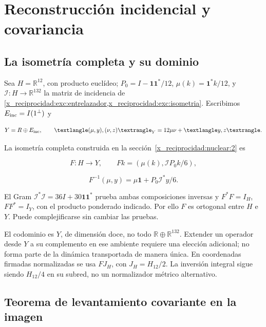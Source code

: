 \chapter{Reconstrucción incidencial y covariancia}
\label{x_reciprocidad:nuclear:5}
\section{La isometría completa y su dominio}\label{x_reciprocidad:nuc05:isometria}

Sea \(H=\mathbb R^{12}\), con producto euclídeo; \(P_0=I-\mathbf1\mathbf1^*/12\), \(\mu(k)=\mathbf1^*k/12\), y \(\mathcal I:H\to\mathbb R^{132}\) la matriz de incidencia de \cref{x_reciprocidad:exc:entrelazador,x_reciprocidad:exc:isometria}. Escribimos \(E_{\rm inc}=\mathcal I(\mathbf1^\perp)\) y

\[
Y=\mathbb R\oplus E_{\rm inc},\qquad
\langle(\mu,y),(\nu,z)\rangle_Y=12\mu\nu+\langle y,z\rangle.
\]

La isometría completa construida en la sección~\ref{x_reciprocidad:nuclear:2} es

\[
F:H\longrightarrow Y,\qquad Fk=(\mu(k),\mathcal I P_0k/6),
\]

\[
F^{-1}(\mu,y)=\mu\mathbf1+P_0\mathcal I^*y/6.
\]

El Gram \(\mathcal I^*\mathcal I=36I+30\mathbf1\mathbf1^*\) prueba ambas composiciones inversas y \(F^*F=I_H\), \(FF^*=I_Y\), con el producto ponderado indicado. Por ello \(F\) es ortogonal entre \(H\) e \(Y\). Puede complejificarse sin cambiar las pruebas.

El codominio es \(Y\), de dimensión doce, no todo \(\mathbb R\oplus\mathbb R^{132}\). Extender un operador desde \(Y\) a su complemento en ese ambiente requiere una elección adicional; no forma parte de la dinámica transportada de manera única. En coordenadas firmadas normalizadas se usa \(FJ_H\), con \(J_H=H_{12}/2\). La inversión integral sigue siendo \(H_{12}/4\) en su subred, no un normalizador métrico alternativo.

\section{Teorema de levantamiento covariante en la imagen}\label{x_reciprocidad:nuc05:levantamiento}

